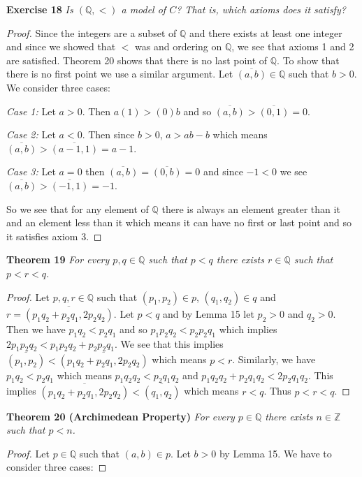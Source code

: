 \documentclass{article}
\begin{document}
\begin{flushleft}
\textbf{Exercise 18}
\textsl{Is $(\mathbb{Q},<)$ a model of $C$? That is, which axioms does it satisfy?}
\begin{proof}
Since the integers are a subset of $\mathbb{Q}$ and there exists at least one integer and since we showed that $<$ was and ordering on $\mathbb{Q}$, we see that axioms 1 and 2 are satisfied. Theorem 20 shows that there is no last point of $\mathbb{Q}$. To show that there is no first point we use a similar argument. Let $\overline{(a,b)} \in \mathbb{Q}$ such that $b>0$. We consider three cases:\newline

\textsl{Case 1:} Let $a>0$. Then $a(1)>(0)b$ and so $\overline{(a,b)} > \overline{(0,1)} = 0$.\newline

\textsl{Case 2:} Let $a<0$. Then since $b>0$, $a>ab-b$ which means $\overline{(a,b)} > \overline{(a-1,1)} = a-1$.\newline

\textsl{Case 3:} Let $a=0$ then $\overline{(a,b)} = \overline{(0,b)} = 0$ and since $-1<0$ we see $\overline{(a,b)}>\overline{(-1,1)}=-1$.\newline

So we see that for any element of $\mathbb{Q}$ there is always an element greater than it and an element less than it which means it can have no first or last point and so it satisfies axiom 3.
\end{proof}

\textbf{Theorem 19}
\textsl{For every $p,q \in \mathbb{Q}$ such that $p<q$ there exists $r \in \mathbb{Q}$ such that $p<r<q$.}
\begin{proof}
Let $p,q,r \in \mathbb{Q}$ such that $(p_1,p_2) \in p$, $(q_1,q_2) \in q$ and $r = \overline{(p_1q_2+p_2q_1,2p_2q_2)}$. Let $p<q$ and by Lemma 15 let $p_2>0$ and $q_2>0$. Then we have $p_1q_2<p_2q_1$ and so $p_1p_2q_2<p_2p_2q_1$ which implies $2p_1p_2q_2<p_1p_2q_2+p_2p_2q_1$. We see that this implies $\overline{(p_1,p_2)} < \overline{(p_1q_2+p_2q_1,2p_2q_2)}$ which means $p<r$. Similarly, we have $p_1q_2<p_2q_1$ which means $p_1q_2q_2<p_2q_1q_2$ and $p_1q_2q_2+p_2q_1q_2<2p_2q_1q_2$. This implies $\overline{(p_1q_2+p_2q_1,2p_2q_2)}<\overline{(q_1,q_2)}$ which means $r<q$. Thus $p<r<q$.
\end{proof}

\textbf{Theorem 20 (Archimedean Property)}
\textsl{For every $p \in \mathbb{Q}$ there exists $n \in \mathbb{Z}$ such that $p<n$.}
\begin{proof}
Let $p \in \mathbb{Q}$ such that $(a,b) \in p$. Let $b>0$ by Lemma 15. We have to consider three cases:\newline


\end{proof}
\end{flushleft}
\end{document}
